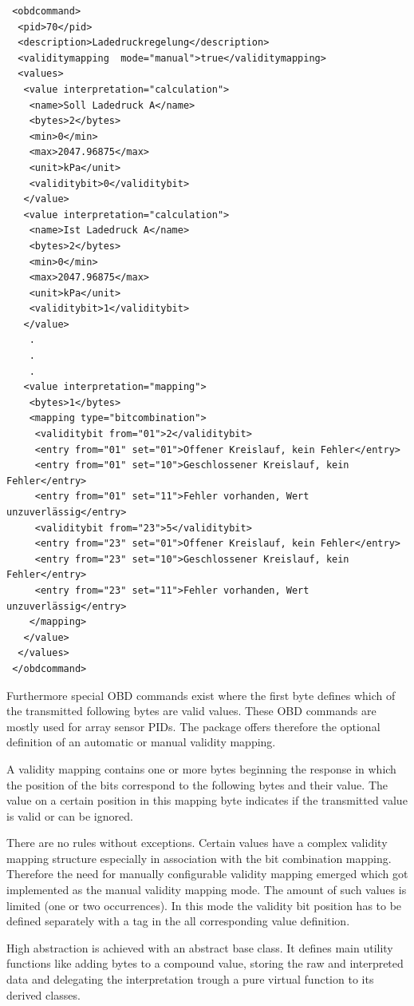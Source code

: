 \begin{verbatim}
 <obdcommand>
  <pid>70</pid>
  <description>Ladedruckregelung</description>
  <validitymapping  mode="manual">true</validitymapping>
  <values>
   <value interpretation="calculation">
    <name>Soll Ladedruck A</name>
    <bytes>2</bytes>
    <min>0</min>
    <max>2047.96875</max>
    <unit>kPa</unit>
    <validitybit>0</validitybit>    
   </value>
   <value interpretation="calculation">
    <name>Ist Ladedruck A</name>
    <bytes>2</bytes>
    <min>0</min>
    <max>2047.96875</max>
    <unit>kPa</unit>    
    <validitybit>1</validitybit>            
   </value>
    .
    .
    .
   <value interpretation="mapping">
    <bytes>1</bytes>
    <mapping type="bitcombination">
     <validitybit from="01">2</validitybit>
     <entry from="01" set="01">Offener Kreislauf, kein Fehler</entry>
     <entry from="01" set="10">Geschlossener Kreislauf, kein Fehler</entry>
     <entry from="01" set="11">Fehler vorhanden, Wert unzuverlässig</entry>
     <validitybit from="23">5</validitybit>
     <entry from="23" set="01">Offener Kreislauf, kein Fehler</entry>
     <entry from="23" set="10">Geschlossener Kreislauf, kein Fehler</entry>
     <entry from="23" set="11">Fehler vorhanden, Wert unzuverlässig</entry>
    </mapping>        
   </value>
  </values>
 </obdcommand>
\end{verbatim}

Furthermore special OBD commands exist where the first byte defines which of the transmitted following bytes are valid values. These OBD 
commands are mostly used for array sensor PIDs. The package offers therefore the optional definition of an automatic or manual validity mapping.

A validity mapping contains one or more bytes beginning the response in which the position of the bits correspond to the following bytes and 
their value. The value on a certain position in this mapping byte indicates if the transmitted value is valid or can be ignored.

There are no rules without exceptions. Certain values have a complex validity mapping structure especially in association with the bit 
combination mapping. Therefore the need for manually configurable validity mapping emerged which got implemented as the manual validity mapping 
mode. The amount of such values is limited (one or two occurrences). In this mode the validity bit position has to be defined separately with a 
tag in the all corresponding value definition. 

High abstraction is achieved with an abstract base class. It defines main utility functions like adding bytes to a compound value, storing the 
raw and interpreted data and delegating the interpretation trough a pure virtual function to its derived classes. 


